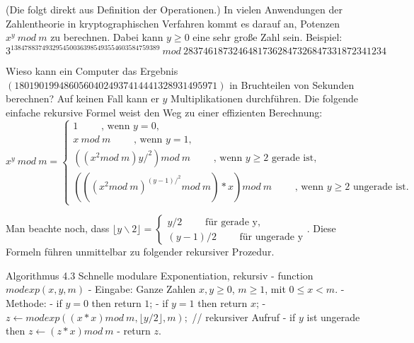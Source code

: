 \documentclass[a4paper]{article}
\begin{document}
\begin{multicols}{3}
    (Die folgt direkt aus Definition der Operationen.)
    In vielen Anwendungen der Zahlentheorie in kryptographischen Verfahren kommt es darauf an, Potenzen $x^y\ mod\ m$ zu berechnen. Dabei kann $y\geq 0$ eine sehr große Zahl sein. Beispiel: $3^{1384788374932954500363985493554603584759389}\ mod\ 28374618732464817362847326847331872341234$

    Wieso kann ein Computer das Ergebnis $(18019019948605604024937414441328931495971)$ in Bruchteilen von Sekunden berechnen? Auf keinen Fall kann er $y$ Multiplikationen durchführen. Die folgende einfache rekursive Formel weist den Weg zu einer effizienten Berechnung:
    $$x^y\ mod\ m=\begin{cases} 1\quad\quad\text{ , wenn } y=0,\\ x\ mod\ m\quad\quad\text{ , wenn } y= 1,\\ ((x^2 mod\ m)y/^2 ) mod\ m\quad\quad\text{ , wenn } y\geq 2 \text{ gerade ist},\\ (((x^2 mod\ m)^{(y-1)/^2} mod\ m)*x) mod\ m\quad\quad\text{ , wenn } y\geq 2 \text{ ungerade ist}.\end{cases}$$

    Man beachte noch, dass $\lfloor y\backslash 2\rfloor=\begin{cases} y/2\quad\quad\text{ für gerade y},\\ (y-1)/2\quad\quad\text{ für ungerade y}\end{cases}$. Diese Formeln führen unmittelbar zu folgender rekursiver Prozedur.

    Algorithmus 4.3 Schnelle modulare Exponentiation, rekursiv
    - function $modexp(x,y,m)$
    - Eingabe: Ganze Zahlen $x,y\geq 0$, $m\geq 1$, mit $0\leq x < m$.
    - Methode:
    - if $y= 0$ then return $1$;
    - if $y= 1$ then return $x$;
    - $z\leftarrow modexp((x*x) mod\ m,\lfloor y/2\rfloor,m);$ // rekursiver Aufruf
    - if $y$ ist ungerade then $z\leftarrow (z*x) mod\ m$
    - return $z$.


\end{multicols}
\end{document}
